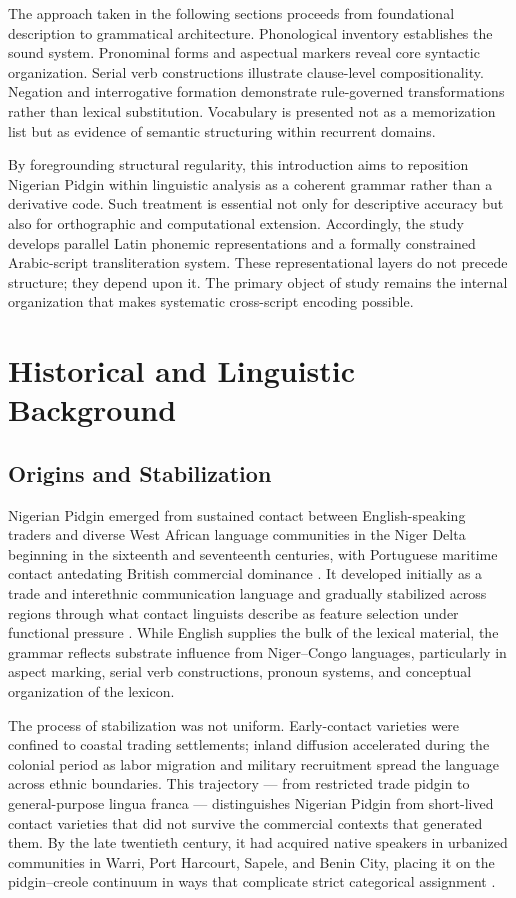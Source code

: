 \documentclass[12pt]{article}
\begin{document}
The approach taken in the following sections proceeds from foundational description to grammatical architecture. Phonological inventory establishes the sound system. Pronominal forms and aspectual markers reveal core syntactic organization. Serial verb constructions illustrate clause-level compositionality. Negation and interrogative formation demonstrate rule-governed transformations rather than lexical substitution. Vocabulary is presented not as a memorization list but as evidence of semantic structuring within recurrent domains.

By foregrounding structural regularity, this introduction aims to reposition Nigerian Pidgin within linguistic analysis as a coherent grammar rather than a derivative code. Such treatment is essential not only for descriptive accuracy but also for orthographic and computational extension. Accordingly, the study develops parallel Latin phonemic representations and a formally constrained Arabic-script transliteration system. These representational layers do not precede structure; they depend upon it. The primary object of study remains the internal organization that makes systematic cross-script encoding possible.

\section{Historical and Linguistic Background}

\subsection{Origins and Stabilization}

Nigerian Pidgin emerged from sustained contact between English-speaking traders and diverse West African language communities in the Niger Delta beginning in the sixteenth and seventeenth centuries, with Portuguese maritime contact antedating British commercial dominance \cite{Holm1988}. It developed initially as a trade and interethnic communication language and gradually stabilized across regions through what contact linguists describe as feature selection under functional pressure \cite{Mufwene2001}. While English supplies the bulk of the lexical material, the grammar reflects substrate influence from Niger--Congo languages, particularly in aspect marking, serial verb constructions, pronoun systems, and conceptual organization of the lexicon.

The process of stabilization was not uniform. Early-contact varieties were confined to coastal trading settlements; inland diffusion accelerated during the colonial period as labor migration and military recruitment spread the language across ethnic boundaries. This trajectory --- from restricted trade pidgin to general-purpose lingua franca --- distinguishes Nigerian Pidgin from short-lived contact varieties that did not survive the commercial contexts that generated them. By the late twentieth century, it had acquired native speakers in urbanized communities in Warri, Port Harcourt, Sapele, and Benin City, placing it on the pidgin--creole continuum in ways that complicate strict categorical assignment \cite{Tosco2000}.
\end{document}

